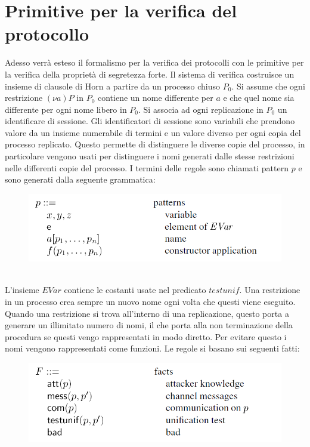 \documentclass[12pt]{article}
\begin{document}
\section*{Primitive per la verifica del protocollo}
Adesso verrà esteso il formalismo per la verifica dei protocolli con le primitive per la verifica della proprietà di segretezza forte. Il sistema di verifica costruisce un insieme di clausole di Horn a partire da un processo chiuso $P_0$. Si assume che ogni restrizione $(\nu a)P$ in $P_0$ contiene un nome differente per $a$ e che quel nome sia differente per ogni nome libero in $P_0$. Si associa ad ogni replicazione in $P_0$ un identificare di sessione. Gli identificatori di sessione sono variabili che prendono valore da un insieme numerabile di termini e un valore diverso per ogni copia del processo replicato. Questo permette di distinguere le diverse copie del processo, in particolare vengono usati per distinguere i nomi generati dalle stesse restrizioni nelle differenti copie del processo. I termini delle regole sono chiamati pattern $p$ e sono generati dalla seguente grammatica:\\
\begin{figure}[ht]
    \centering
    \includegraphics[scale=0.7]{Relazione/Immagini/rule.PNG}
\end{figure}\\
L'insieme $EVar$ contiene le costanti usate nel predicato $testunif$. Una restrizione in un processo crea sempre un nuovo nome ogni volta che questi viene eseguito. Quando una restrizione si trova all'interno di una replicazione, questo porta a generare un illimitato numero di nomi, il che porta alla non terminazione della procedura se questi vengo rappresentati in modo diretto. Per evitare questo i nomi vengono rappresentati come funzioni. Le regole si basano sui seguenti fatti:\\   
\begin{figure}[h]
    \centering
    \includegraphics[scale=0.6]{Relazione/Immagini/fatti.PNG}
\end{figure}\\
\end{document}
